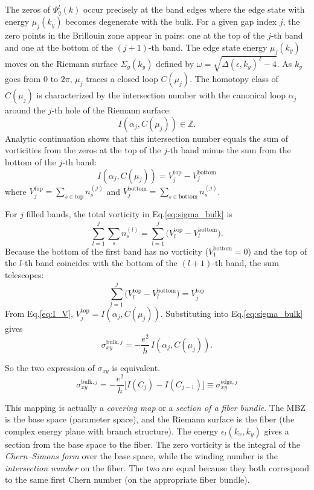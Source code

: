 \documentclass[12pt,a4paper]{article}
\begin{document}
    The zeros of $\Psi_{q}^{l}(k)$ occur precisely at the band edges where the edge state with energy $\mu_{j}(k_{y})$ becomes degenerate with the bulk. For a given gap index $j$, the zero points in the Brillouin zone appear in pairs: one at the top of the $j$‑th band and one at the bottom of the $(j+1)$-th band. The edge state energy $\mu_{j}(k_{y})$ moves on the Riemann surface $\Sigma_{g}(k_{y})$ defined by $\omega=\sqrt{\Delta(\epsilon,k_{y})^{2}-4}$. As $k_{y}$ goes from $0$ to $2\pi$, $\mu_{j}$ traces a closed loop $C(\mu_{j})$. The homotopy class of $C(\mu_{j})$ is characterized by the intersection number with the canonical loop $\alpha_{j}$ around the $j$‑th hole of the Riemann surface:
    \[
        I(\alpha_{j},C(\mu_{j})) \in \mathbb{Z}.
    \]
    Analytic continuation shows that this intersection number equals the sum of vorticities from the zeros at the top of the $j$‑th band minus the sum from the bottom of the $j$‑th band:
    \begin{equation}
    \label{eq:I_V}
        I(\alpha_j,C(\mu_j)) = V_j^{\mathrm{top}} - V_j^{\mathrm{bottom}}
    \end{equation}
    where $V_{j}^{\mathrm{top}}=\sum_{s\in\text{top}} n_{s}^{(j)}$ and $V_{j}^{\mathrm{bottom}}=\sum_{s\in\text{bottom}} n_{s}^{(j)}$.

    For $j$ filled bands, the total vorticity in Eq.\eqref{eq:sigma_bulk} is
    \[
        \sum_{l=1}^{j}\sum_{s} n_{s}^{(l)}
        = \sum_{l=1}^{j}\bigl(V_{l}^{\mathrm{top}} - V_{l}^{\mathrm{bottom}}\bigr).
    \]
    Because the bottom of the first band has no vorticity ($V_{1}^{\mathrm{bottom}}=0$) and the top of the $l$‑th band coincides with the bottom of the $(l+1)$-th band, the sum telescopes:
    \[
        \sum_{l=1}^{j}\bigl(V_{l}^{\mathrm{top}} - V_{l}^{\mathrm{bottom}}\bigr) = V_{j}^{\mathrm{top}}
    \]
    From Eq.\eqref{eq:I_V}, $V_{j}^{\mathrm{top}} = I(\alpha_{j},C(\mu_{j}))$. Substituting into Eq.\eqref{eq:sigma_bulk} gives
    \[
    \sigma_{xy}^{\mathrm{bulk},j} = -\frac{e^{2}}{h}\, I(\alpha_{j},C(\mu_{j})).
    \]

    So the two expression of $\sigma_{xy}$ is equivalent.
    \[
        \sigma_{xy}^{\text{bulk},j} = -\frac{e^{2}}{h}\bigl[ I(C_{j}) - I(C_{j-1}) \bigr] \equiv \sigma_{xy}^{\text{edge},j}
    \]

    \begin{rem}
        This mapping is actually a \textit{covering map} or a \textit{section of a fiber bundle}. The MBZ is the base space (parameter space), and the Riemann surface is the fiber (the complex energy plane with branch structure). The energy $\epsilon_l(k_x, k_y)$ gives a section from the base space to the fiber. The zero vorticity is the integral of the \textit{Chern–Simons form} over the base space, while the winding number is the \textit{intersection number} on the fiber. The two are equal because they both correspond to the same first Chern number (on the appropriate fiber bundle).
    \end{rem}
\end{document}
